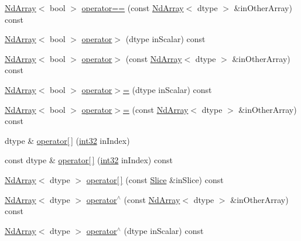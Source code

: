 \begin{DoxyCompactItemize}
\item 
\mbox{\hyperlink{class_num_cpp_1_1_nd_array}{Nd\+Array}}$<$ bool $>$ \mbox{\hyperlink{class_num_cpp_1_1_nd_array_ac5950eb2aae170ad83768f7840e90887}{operator==}} (const \mbox{\hyperlink{class_num_cpp_1_1_nd_array}{Nd\+Array}}$<$ dtype $>$ \&in\+Other\+Array) const
\item 
\mbox{\hyperlink{class_num_cpp_1_1_nd_array}{Nd\+Array}}$<$ bool $>$ \mbox{\hyperlink{class_num_cpp_1_1_nd_array_a0b0d33dd3713da9a966b1b08543303a2}{operator$>$}} (dtype in\+Scalar) const
\item 
\mbox{\hyperlink{class_num_cpp_1_1_nd_array}{Nd\+Array}}$<$ bool $>$ \mbox{\hyperlink{class_num_cpp_1_1_nd_array_adec05f9b335ef7d015827de174a76dc7}{operator$>$}} (const \mbox{\hyperlink{class_num_cpp_1_1_nd_array}{Nd\+Array}}$<$ dtype $>$ \&in\+Other\+Array) const
\item 
\mbox{\hyperlink{class_num_cpp_1_1_nd_array}{Nd\+Array}}$<$ bool $>$ \mbox{\hyperlink{class_num_cpp_1_1_nd_array_a1f4ae1fe7ae8c5d9d42310a6da4eda9d}{operator$>$=}} (dtype in\+Scalar) const
\item 
\mbox{\hyperlink{class_num_cpp_1_1_nd_array}{Nd\+Array}}$<$ bool $>$ \mbox{\hyperlink{class_num_cpp_1_1_nd_array_ad2a6c6d2f55bf423a199d3184fc42b46}{operator$>$=}} (const \mbox{\hyperlink{class_num_cpp_1_1_nd_array}{Nd\+Array}}$<$ dtype $>$ \&in\+Other\+Array) const
\item 
dtype \& \mbox{\hyperlink{class_num_cpp_1_1_nd_array_a71ba3fbd191e766c38ba5533473b08c2}{operator\mbox{[}$\,$\mbox{]}}} (\mbox{\hyperlink{namespace_num_cpp_acf3eb1592f8b248ff0a236634864633c}{int32}} in\+Index)
\item 
const dtype \& \mbox{\hyperlink{class_num_cpp_1_1_nd_array_a51d1075cd14c8be1e6ecc9198b41a1c9}{operator\mbox{[}$\,$\mbox{]}}} (\mbox{\hyperlink{namespace_num_cpp_acf3eb1592f8b248ff0a236634864633c}{int32}} in\+Index) const
\item 
\mbox{\hyperlink{class_num_cpp_1_1_nd_array}{Nd\+Array}}$<$ dtype $>$ \mbox{\hyperlink{class_num_cpp_1_1_nd_array_a7ce2e487c5f9b853d6de0265f303a143}{operator\mbox{[}$\,$\mbox{]}}} (const \mbox{\hyperlink{class_num_cpp_1_1_slice}{Slice}} \&in\+Slice) const
\item 
\mbox{\hyperlink{class_num_cpp_1_1_nd_array}{Nd\+Array}}$<$ dtype $>$ \mbox{\hyperlink{class_num_cpp_1_1_nd_array_ac673513782efac273bad25654c462205}{operator$^\wedge$}} (const \mbox{\hyperlink{class_num_cpp_1_1_nd_array}{Nd\+Array}}$<$ dtype $>$ \&in\+Other\+Array) const
\item 
\mbox{\hyperlink{class_num_cpp_1_1_nd_array}{Nd\+Array}}$<$ dtype $>$ \mbox{\hyperlink{class_num_cpp_1_1_nd_array_ae6d8d3e0dba5d6bbfa95a1e1f659005f}{operator$^\wedge$}} (dtype in\+Scalar) const

\end{DoxyCompactItemize}
